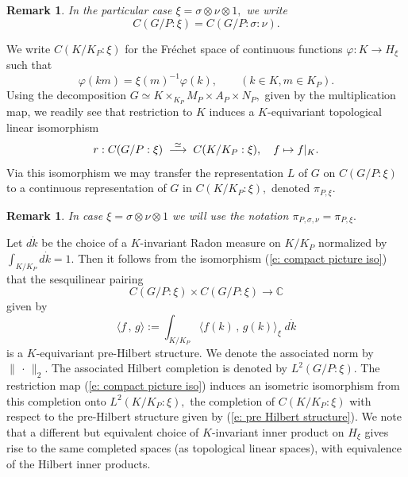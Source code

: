 \documentclass[12pt,a4paper]{article}
\newtheorem{Rem}[Thm]{Remark}
\newenvironment{rem}[0]{\begin{Rem}\noindent\rm}%
{\end{Rem}}
\def\qquad{\quad\quad}
\def\msy#1{{\mathbb #1}}
\def\C{{\msy C}}
\def\gf{\varphi}
\def\gs{\sigma}
\def\to{\rightarrow}
\def\inp#1#2{\langle#1\,,\,#2\rangle}
\numberwithin{Thm}{section}
\numberwithin{equation}{section}
\def\dotvar{\, \cdot\,}
\numberwithin{equation}{section}
\begin{document}
\begin{rem}
In the particular case  $\xi = \gs \otimes \nu \otimes 1,$ we write 
$$ 
C(G/P:\xi) = C(G/P: \gs :\nu).
$$%
\end{rem}
We write 
$C(K/K_P: \xi)$ for the Fr\'echet space of continuous functions $\gf: K \to H_\xi$ such that
\begin{equation}
\label{e: rule compact picture}
\gf(km) = \xi(m)^{-1} \gf(k), \qquad (k\in K, m \in K_P).
\end{equation}
Using the decomposition $G \simeq K \times_{K_P} M_P \times A_P \times N_P,$ 
given by the multiplication map, we readily see that restriction 
to $K$ induces a $K$-equivariant topological linear isomorphism
\begin{equation} 
\label{e: compact picture iso}
r: C(G/P:\xi) \;\;{\buildrel \simeq\over \longrightarrow } \;\; C(K/K_P:\xi), \quad f\mapsto f|_K.
\end{equation}
Via this isomorphism we may transfer the representation $L$ of $G$ on 
$C(G/P:\xi)$ to a continuous representation of $G$ in $C(K/K_P: \xi),$ 
denoted $\pi_{P,\xi}.$ 
\begin{rem}
In case $\xi = \gs \otimes \nu \otimes 1$ we will use the notation $\pi_{P,\gs, \nu} = \pi_{P,\xi}.$ 
\end{rem}
Let $d\dot{k}$ be the choice of a $K$-invariant Radon measure on $K/K_P$ normalized by 
$\int_{K/K_P} d\dot{k} = 1.$ 
Then it follows from the isomorphism (\ref{e: compact picture iso}) that the 
sesquilinear pairing
\begin{equation}
\label{e: pairing induced reps}
C(G/P:\xi) \times C(G/ P:\xi) \to \C
\end{equation} 
given by 
\begin{equation}
\label{e: pre Hilbert structure}
\inp{f}{g}:= \int_{K/K_P} \inp{f(k)}{g(k)}_\xi \; d\dot{k}
\end{equation} 
is a $K$-equivariant pre-Hilbert structure. We denote the associated norm 
by $\|\dotvar \|_2. $ The associated 
Hilbert completion is denoted by $L^2(G/P: \xi).$ The restriction map 
(\ref{e: compact picture iso}) induces an isometric isomorphism from this 
completion onto $L^2(K/K_P:\xi ),$ the completion of $C(K/K_P:\xi)$ with respect to 
the pre-Hilbert structure given by (\ref{e: pre Hilbert structure}).
%
We note that a different but equivalent choice of $K$-invariant inner product on $H_\xi$ 
gives rise to the same completed spaces (as topological linear spaces), with equivalence of the 
Hilbert inner products. 
%
\end{document}
